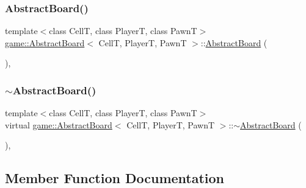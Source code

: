 \subsubsection{\texorpdfstring{Abstract\+Board()}{AbstractBoard()}\hspace{0.1cm}{\footnotesize\ttfamily [2/2]}}
{\footnotesize\ttfamily template$<$class CellT, class PlayerT, class PawnT$>$ \\
\hyperlink{classgame_1_1_abstract_board}{game\+::\+Abstract\+Board}$<$ CellT, PlayerT, PawnT $>$\+::\hyperlink{classgame_1_1_abstract_board}{Abstract\+Board} (\begin{DoxyParamCaption}\item[{const \hyperlink{classgame_1_1_abstract_board}{Abstract\+Board}$<$ CellT, PlayerT, PawnT $>$ \&}]{ }\end{DoxyParamCaption})\hspace{0.3cm}{\ttfamily [explicit]}, {\ttfamily [delete]}}

\mbox{\label{classgame_1_1_abstract_board_a1331343872024287df1749cea4a96f5e}} 
\subsubsection{\texorpdfstring{$\sim$\+Abstract\+Board()}{~AbstractBoard()}}
{\footnotesize\ttfamily template$<$class CellT, class PlayerT, class PawnT$>$ \\
virtual \hyperlink{classgame_1_1_abstract_board}{game\+::\+Abstract\+Board}$<$ CellT, PlayerT, PawnT $>$\+::$\sim$\hyperlink{classgame_1_1_abstract_board}{Abstract\+Board} (\begin{DoxyParamCaption}{ }\end{DoxyParamCaption})\hspace{0.3cm}{\ttfamily [inline]}, {\ttfamily [virtual]}}



\subsection{Member Function Documentation}
\mbox{\label{classgame_1_1_abstract_board_a689982e6640633d78008157906c6d63a}} 
